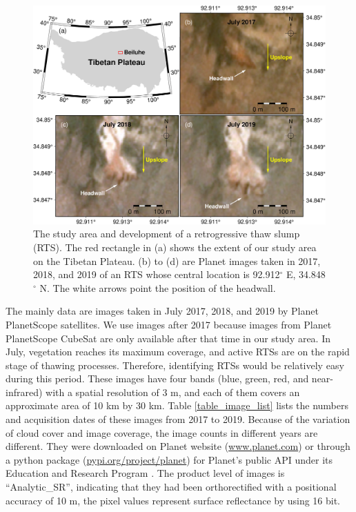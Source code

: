 \documentclass[authoryear,preprint,review,12pt]{elsarticle}
\begin{document}
\begin{figure} 
	\centering
	\includegraphics[width=14cm]{figs/rts_multi_images_study_area_v3.jpg}
	\caption{The study area and development of a retrogressive thaw slump (RTS). The red 
	rectangle in (a) shows the extent of our study area
	on the Tibetan Plateau. (b) to (d) are Planet images taken in 2017, 2018, and 2019 of an RTS whose central location is 92.912$^\circ$ E, 34.848$^\circ$ N. The white arrows point the position of the headwall.} %
	\label{fig_multi_rts_image_studyarea}
\end{figure}


The mainly data are images taken in July 2017, 2018, and 2019 by Planet PlanetScope satellites.
We use images after 2017 because images from Planet PlanetScope CubeSat are only available after that time in our study area.  
In July, vegetation reaches its maximum coverage, and active RTSs are on the rapid stage of thawing processes. 
Therefore, identifying RTSs would be relatively easy during this period.
These images have four bands (blue, green, red, and near-infrared) with a spatial resolution of 3 m, and each of them covers an approximate area of 10 km by 30 km.
Table \ref{table_image_list} lists the numbers and acquisition dates of these images from 2017 to 2019. 
Because of the variation of cloud cover and image coverage, the image counts in different years are different.
They were downloaded on Planet website (\url{www.planet.com}) or through a python package (\url{pypi.org/project/planet}) for Planet's public API under its Education and Research Program \citep{team2018planet}. 
The product level of images is ``Analytic\_SR'', indicating that they had been orthorectified with a positional accuracy of 10 m, the pixel values represent surface reflectance by using 16 bit. 
\end{document}
